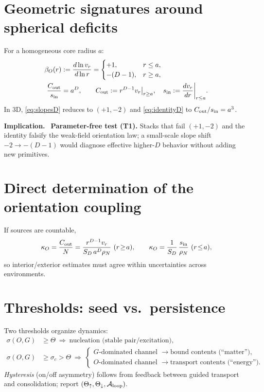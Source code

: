\documentclass[12pt,a4paper,oneside]{scrreprt}
\newenvironment{implication}{\par\vspace{0.5em}\noindent\textbf{Implication.}\ }{\par\vspace{0.5em}}
\begin{document}
\section{Geometric signatures around spherical deficits}\label{sec:ur-signatures}
For a homogeneous core radius $a$:
\begin{align}
\beta_O(r)&:=\frac{d\ln v_r}{d\ln r}=\begin{cases}+1,& r\le a,\\ -(D-1),& r\ge a,\end{cases}\label{eq:slopesD}\\
\frac{C_{\rm out}}{s_{\rm in}}&=a^{D},\qquad 
C_{\rm out}:=r^{D-1}v_r\big|_{r\ge a},\quad
s_{\rm in}:=\frac{dv_r}{dr}\bigg|_{r\le a}.
\label{eq:identityD}
\end{align}
In 3D, \eqref{eq:slopesD} reduces to $(+1,-2)$ and \eqref{eq:identityD} to $C_{\rm out}/s_{\rm in}=a^3$.
\begin{implication}
\textbf{Parameter-free test (T1).} Stacks that fail $(+1,-2)$ and the identity falsify the weak-field orientation law; a small-scale slope shift $-2\to-(D-1)$ would diagnose effective higher-$D$ behavior without adding new primitives.
\end{implication}

\section{Direct determination of the orientation coupling}\label{sec:ur-kappa}
If sources are countable,
\begin{equation}
\kappa_O=\frac{C_{\rm out}}{N}=\frac{r^{D-1}v_r}{S_D\,a^{D}\rho_N}\ (r\!\ge\!a),
\qquad 
\kappa_O=\frac{1}{S_D}\,\frac{s_{\rm in}}{\rho_N}\ (r\!\le\!a),
\end{equation}
so interior/exterior estimates must agree within uncertainties across environments.

\section{Thresholds: seed vs.\ persistence}\label{sec:ur-thresholds}
Two thresholds organize dynamics:
\begin{align}
\sigma(O,G)&\ge\Theta \ \Rightarrow\ \text{nucleation (stable pair/excitation)},\\
\sigma(O,G)&\ge\sigma_c>\Theta \ \Rightarrow\ 
\begin{cases}
\text{$G$-dominated channel }\to \text{bound contents (``matter'')},\\
\text{$O$-dominated channel }\to \text{transport contents (``energy'')}.
\end{cases}
\end{align}
\emph{Hysteresis} (on/off asymmetry) follows from feedback between guided transport and consolidation; report $(\Theta_\uparrow,\Theta_\downarrow,\mathcal A_{\rm loop})$.
\end{document}
